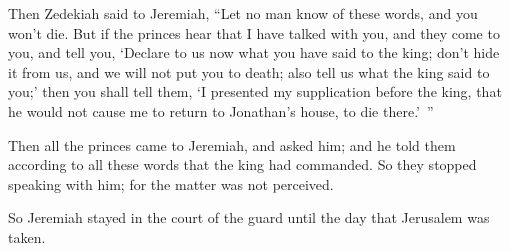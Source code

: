 {\par }{\PP {}Then Zedekiah said to Jeremiah, “Let no man know of these words, and you won’t die.
But if the princes hear that I have talked with you, and they come to you, and tell you, ‘Declare to us now what you have said to the king; don’t hide it from us, and we will not put you to death; also tell us what the king said to you;’
then you shall tell them, ‘I presented my supplication before the king, that he would not cause me to return to Jonathan’s house, to die there.’ ”
\par }{\PP {}Then all the princes came to Jeremiah, and asked him; and he told them according to all these words that the king had commanded. So they stopped speaking with him; for the matter was not perceived.
\par }{\PP {}So Jeremiah stayed in the court of the guard until the day that Jerusalem was taken.

}
